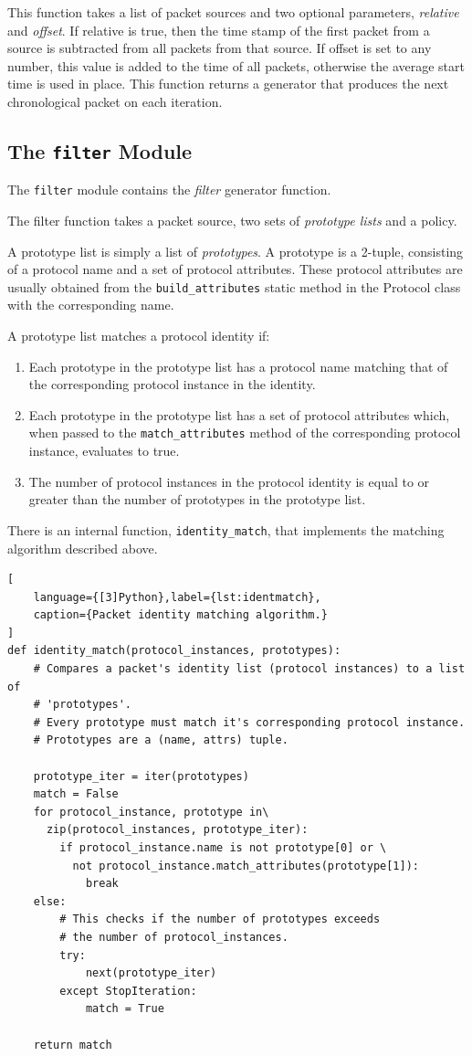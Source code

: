 \documentclass[10pt,a4paper,notitlepage]{report}
\begin{document}
This function takes a list of packet sources and two optional parameters, \emph{relative} and \emph{offset}.
If relative is true, then the time stamp of the first packet from a source is subtracted from all packets from that source.
If offset is set to any number, this value is added to the time of all packets, otherwise the average start time is used in place. This function returns a generator that produces the next chronological packet on each iteration.

\subsection{The \texttt{filter} Module}
The \texttt{filter} module contains the \emph{filter} generator function.

The filter function takes a packet source, two sets of \emph{prototype lists} and a policy.

A prototype list is simply a list of \emph{prototypes}. A prototype is a 2-tuple, consisting of a protocol name and a set of protocol attributes. These protocol attributes are usually obtained from the \texttt{build_attributes} static method in the Protocol class with the corresponding name.

A prototype list matches a protocol identity if:
\begin{enumerate}[label=\roman*)]
\item Each prototype in the prototype list has a protocol name matching that of the corresponding protocol instance in the identity.
\item Each prototype in the prototype list has a set of protocol attributes which, when passed to the \texttt{match_attributes} method of the corresponding protocol instance, evaluates to true.
\item The number of protocol instances in the protocol identity is equal to or greater than the number of prototypes in the prototype list.
\end{enumerate}

There is an internal function, \texttt{identity_match}, that implements the matching algorithm described above.

\begin{lstlisting}[
	language={[3]Python},label={lst:identmatch},
	caption={Packet identity matching algorithm.}
]
def identity_match(protocol_instances, prototypes):
    # Compares a packet's identity list (protocol instances) to a list of
    # 'prototypes'.
    # Every prototype must match it's corresponding protocol instance.
    # Prototypes are a (name, attrs) tuple.
    
    prototype_iter = iter(prototypes)
    match = False
    for protocol_instance, prototype in\
      zip(protocol_instances, prototype_iter):
        if protocol_instance.name is not prototype[0] or \
          not protocol_instance.match_attributes(prototype[1]):
            break
    else:
        # This checks if the number of prototypes exceeds
        # the number of protocol_instances.
        try:
            next(prototype_iter)
        except StopIteration:
            match = True

    return match
\end{lstlisting}
\end{document}
